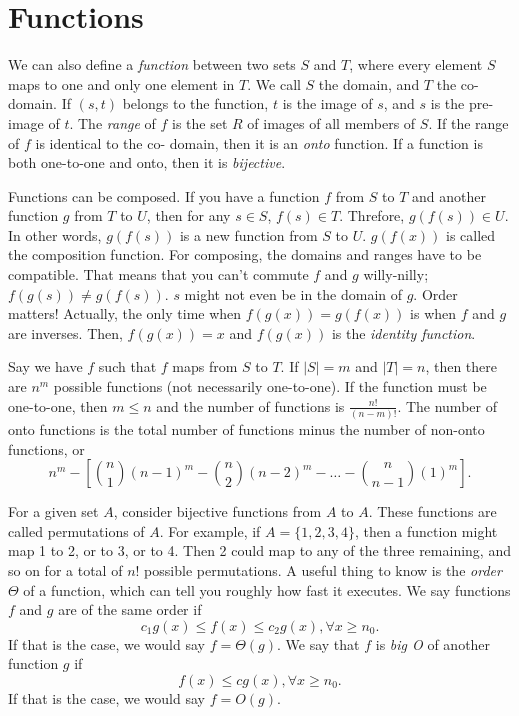 \documentclass[nobib]{tufte-handout}
\begin{document}
\section{Functions}

We can also define a \emph{function} between two sets $S$ and $T$, where 
every element $S$ maps to one and only one element in $T$. We call $S$ the domain, 
and $T$ the co-domain. If $(s, t)$ belongs to the function, $t$ is the
image of $s$, and $s$ is the pre-image of $t$. The \emph{range} of $f$ is the set $R$
of images of all members of $S$.
If the range of $f$ is identical to the co-
domain, then it is an \emph{onto} function. If a function is both one-to-one 
and onto, then it is \emph{bijective}. 

Functions can be composed. If you have a function $f$ from $S$ to $T$ and another 
function $g$ from $T$ to $U$, then for any $s\in S$, $f(s) \in T$. Threfore, 
$g(f(s)) \in U$. In other words, $g(f(s))$ is a new function from $S$ to $U$. $g(f(x))$ 
is called the composition function. For composing, the domains and ranges have to 
be compatible. That means that you can't commute $f$ and $g$ willy-nilly;
$f(g(s)) \neq g(f(s))$. $s$ might not even be in the domain of $g$. Order matters!
Actually, the only time when $f(g(x)) = g(f(x))$ is when $f$ and $g$ are inverses. 
Then, $f(g(x)) = x$ and $f(g(x))$ is the \emph{identity function}. 
    
Say we have $f$ such that $f$ maps from $S$ to $T$. If $|S| = m$ and $|T| = n$, 
then there are $n^m$ possible functions (not necessarily one-to-one). If the function 
must be one-to-one, then $m \leq n$ and the number of functions is $\frac{n!}{(n-m)!}$.
The number of onto functions is the total number of functions minus the number of non-onto functions, 
or
\[n^m - [{n \choose 1}(n-1)^m - {n \choose 2}(n-2)^m - \dots - {n \choose n-1}(1)^m].\]

For a given set $A$, consider bijective functions from $A$ to $A$. These functions 
are called permutations of $A$. For example, if $A = \{1, 2, 3, 4\}$, then a function might map 
1 to 2, or to 3, or to 4. Then 2 could map to any of the three remaining, and so on 
for a total of $n!$ possible permutations. 
A useful thing to know is the \emph{order} $\Theta$ of a function, 
which can tell you roughly how fast it executes. We say functions $f$ and $g$ 
are of the same order if 
\[c_1g(x) \leq f(x) \leq c_2g(x), \forall x\geq n_0.\]
If that is the case, we would say $f=\Theta(g)$. 
We say that $f$ is \emph{big O} of another function $g$ if 
\[f(x) \leq c g(x), \forall x\geq n_0.\]
If that is the case, we would say $f=O(g)$. 
\end{document}
